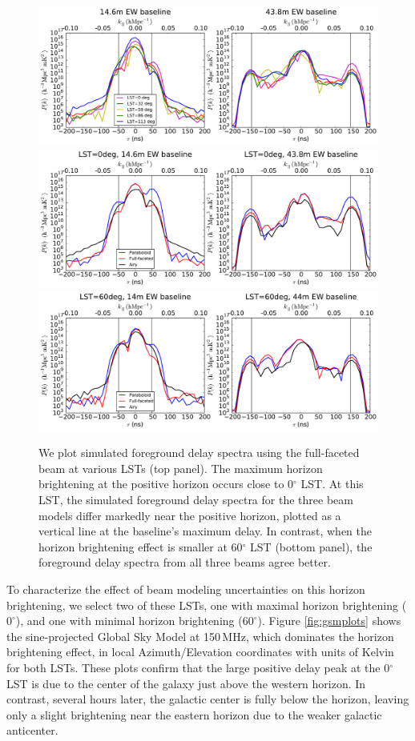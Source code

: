 \documentclass{emulateapj}
\begin{document}
\begin{figure}[h]
\centering
\includegraphics[width=6in]{nithya_fg_pspec_all_lst.pdf}
\includegraphics[width=6in]{nithya_fg_pspec_lst0deg.pdf}
\includegraphics[width=6in]{nithya_fg_pspec_lst60deg.pdf}
\caption{We plot simulated foreground delay spectra using the full-faceted beam at various LSTs (top panel). The maximum horizon brightening at the positive horizon occurs close to 0$^\circ$ LST. At this LST, the simulated foreground delay spectra for the three beam models differ markedly near the positive horizon, plotted as a vertical line at the baseline's maximum delay. In contrast, when the horizon brightening effect is smaller at 60$^\circ$ LST (bottom panel), the foreground delay spectra from all three beams agree better.}
\label{fig:delayspec}
\end{figure}

To characterize the effect of beam modeling uncertainties on this horizon brightening, we select two of these LSTs, one with maximal horizon brightening ($0^\circ$), and one with minimal horizon brightening ($60^\circ$). Figure \ref{fig:gsmplots} shows the sine-projected Global Sky Model at 150\,MHz, which dominates the horizon brightening effect, in local Azimuth/Elevation coordinates with units of Kelvin for both LSTs. These plots confirm that the large positive delay peak at the 0$^\circ$ LST is due to the center of the galaxy just above the western horizon. In contrast, several hours later, the galactic center is fully below the horizon, leaving only a slight brightening near the eastern horizon due to the weaker galactic anticenter. 
\end{document}
